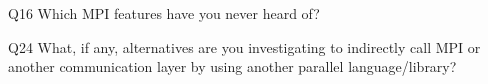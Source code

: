 \begin{description}%
\item{Q16} Which MPI features have you never heard of?%
\item{Q24} What, if any, alternatives are you investigating to indirectly call MPI or another communication layer by using another parallel language/library?%
\end{description}%

